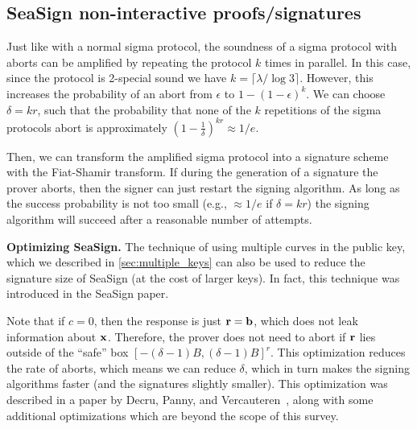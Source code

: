 \subsection{SeaSign non-interactive proofs/signatures}

Just like with a normal sigma protocol, the soundness of a sigma protocol with aborts can be amplified by repeating the protocol $k$ times in parallel.
In this case, since the protocol is 2-special sound we have $k = \lceil \lambda / \log 3 \rceil$. However, this increases the probability of an abort from $\epsilon$ to $1-(1-\epsilon)^k$. We can choose $\delta = kr$, such that the probability that none of the $k$ repetitions of the sigma protocols abort is approximately $(1-\frac{1}{\delta})^{kr} \approx 1/e$.

Then, we can transform the amplified sigma protocol into a signature scheme with the Fiat-Shamir transform. If during the generation of a signature the prover aborts, then the signer can just restart the signing algorithm. As long as the success probability is not too small (e.g., $\approx 1/e$ if $\delta = kr$) the signing algorithm will succeed after a reasonable number of attempts.

{\bf Optimizing SeaSign.} The technique of using multiple curves in the public key, which we described in \cref{sec:multiple_keys} can also be used to reduce the signature size of SeaSign (at the cost of larger keys). In fact, this technique was introduced in the SeaSign paper.

Note that if $c=0$, then the response is just $\mathbf{r} = \mathbf{b}$, which does not leak information about $\mathbf{x}$. Therefore, the prover does not need to abort if $\mathbf{r}$ lies outside of the ``safe'' box $[-(\delta-1)B,(\delta-1)B]^r$. This optimization reduces the rate of aborts, which means we can reduce $\delta$, which in turn makes the signing algorithms faster (and the signatures slightly smaller). This optimization was described in a paper by Decru, Panny, and Vercauteren~\cite{FasterSeaSign}, along with some additional optimizations which are beyond the scope of this survey.
